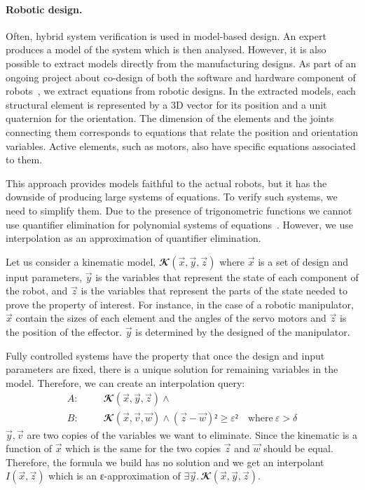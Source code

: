 \paragraph{Robotic design.}
Often, hybrid system verification is used in model-based design.
An expert produces a model of the system which is then analysed.
However, it is also possible to extract models directly from the manufacturing designs.
As part of an ongoing project about co-design of both the software and hardware component of robots~\cite{react}, we extract equations from robotic designs.
In the extracted models, each structural element is represented by a 3D vector for its position and a unit quaternion for the orientation.
The dimension of the elements and the joints connecting them corresponds to equations that relate the position and orientation variables.
Active elements, such as motors, also have specific equations associated to them.

This approach provides models faithful to the actual robots, but it has the downside of producing large systems of equations.
To verify such systems, we need to simplify them.
Due to the presence of trigonometric functions we cannot use quantifier elimination for polynomial systems of equations~\cite{qepcad}.
However, we use interpolation as an approximation of quantifier elimination.

Let us consider a kinematic model, $𝓚(\vec x,\vec y,\vec z)$ where $\vec x$ is a set of design and input parameters, $\vec y$ is the variables that represent the state of each component of the robot, and $\vec z$ is the variables that represent the parts of the state needed to prove the property of interest.
For instance, in the case of a robotic manipulator, $\vec x$ contain the sizes of each element and the angles of the servo motors and $\vec z$ is the position of the effector.
$\vec y$ is determined by the designed of the manipulator.

Fully controlled systems have the property that once the design and input parameters are fixed, there is a unique solution for remaining variables in the model.
Therefore, we can create an interpolation query:
\begin{eqnarray*}
A: &~~~~ &  𝓚(\vec x,\vec y,\vec z) ∧ \\
B: &~~~~ &  𝓚(\vec x,\vec v,\vec w) ∧ (\vec z-\vec w)² ≥ ε² \quad \text{where} ~ ε > δ
\end{eqnarray*}
$\vec y, \vec v$ are two copies of the variables we want to eliminate.
Since the kinematic is a function of $\vec x$ which is the same for the two copies $\vec z$ and $\vec w$ should be equal.
Therefore, the formula we build has no solution and we get an interpolant $I(\vec x,\vec z)$ which is an ε-approximation of $∃ \vec y.\,𝓚(\vec x,\vec y,\vec z)$.


